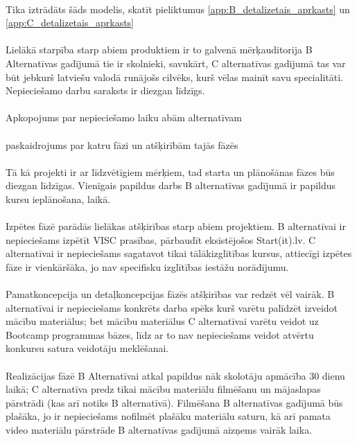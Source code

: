 \paragraph{}
Tika iztrādāts šāds modelis, skatīt pieliktumus \ref{app:B_detalizetais_aprkasts} un \ref{app:C_detalizetais_aprkasts}
\paragraph{}
Lielākā starpība starp abiem produktiem ir to galvenā mērķauditorija B Alternatīvas gadījumā tie ir skolnieki, savukārt,
C alternatīvas gadījumā tas var būt jebkurš latviešu valodā runājošs cilvēks, kurš vēlas mainīt savu specialitāti.
Nepieciešamo darbu saraksts ir diezgan līdzīgs.
\paragraph{}
Apkopojums par nepieciešamo laiku abām alternatīvam
\paragraph{}
paskaidrojums par katru fāzi un atšķirībām tajās fāzēs
\paragraph{}
Tā kā projekti ir ar līdzvētīgiem mērķiem, tad starta un plānošānas fāzes būs diezgan līdzīgas. Vienīgais papildus darbs
B alternatīvas gadījumā ir papildus kursu ieplānošana, laikā.
\paragraph{}
Izpētes fāzē parādās lielākas atšķirības starp abiem projektiem. B alternatīvai ir nepieciešams izpētīt VISC prasības,
pārbaudīt eksistējošos Start(it).lv. C alternatīvai ir nepieciešams sagatavot tikai tālākizglītības kursus, attiecīgi
izpētes fāze ir vienkāršāka, jo nav specifisku izglītības iestāžu norādījumu.
\paragraph{}
Pamatkoncepcija un detaļkoncepcijas fāzēs atšķirības var redzēt vēl vairāk. B alternatīvai ir 
nepieciešams konkrēts darba spēks kurš varētu palīdzēt izveidot mācību materiālus; bet mācību materiālus C alternatīvai
varētu veidot uz Bootcamp programmas bāzes, līdz ar to nav nepieciešams veidot atvērtu konkursu satura veidotāju meklēšanai.
\paragraph{}
Realizācijas fāzē B Alternatīvai atkal papildus nāk skolotāju apmācība 30 dienu laikā; C alternatīva predz tikai mācību materiālu
filmēšanu un mājaslapas pārstrādi (kas arī notiks B alternatīvā). Filmēšana B alternatīvas gadījumā būs plašāka, jo ir nepieciešams
nofilmēt plašāku materiālu saturu, kā arī pamata video materiālu pārstrāde B alternatīvas gadījumā aizņems vairāk laika.
